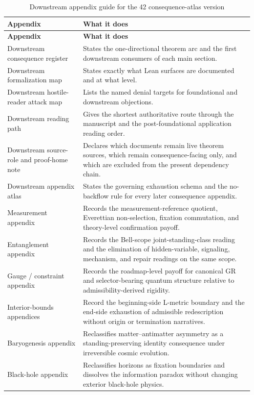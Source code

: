 \begin{longtable}{P{0.28\textwidth}P{0.62\textwidth}}
\caption{Downstream appendix guide for the 42 consequence-atlas version}\\
\toprule
\textbf{Appendix} & \textbf{What it does} \\
\midrule
\endfirsthead
\toprule
\textbf{Appendix} & \textbf{What it does} \\
\midrule
\endhead
\bottomrule
\endfoot
Downstream consequence register & States the one-directional theorem arc and the first downstream consumers of each main section. \\
Downstream formalization map & States exactly what Lean surfaces are documented and at what level. \\
Downstream hostile-reader attack map & Lists the named denial targets for foundational and downstream objections. \\
Downstream reading path & Gives the shortest authoritative route through the manuscript and the post-foundational application reading order. \\
Downstream source-role and proof-home note & Declares which documents remain live theorem sources, which remain consequence-facing only, and which are excluded from the present dependency chain. \\
Downstream appendix atlas & States the governing exhaustion schema and the no-backflow rule for every later consequence appendix. \\
Measurement appendix & Records the measurement-reference quotient, Everettian non-selection, fixation commutation, and theory-level confirmation payoff. \\
Entanglement appendix & Records the Bell-scope joint-standing-class reading and the elimination of hidden-variable, signaling, mechanism, and repair readings on the same scope. \\
Gauge / constraint appendix & Records the roadmap-level payoff for canonical GR and selector-bearing quantum structure relative to admissibility-derived rigidity. \\
Interior-bounds appendices & Record the beginning-side L-metric boundary and the end-side exhaustion of admissible redescription without origin or termination narratives. \\
Baryogenesis appendix & Reclassifies matter--antimatter asymmetry as a standing-preserving identity consequence under irreversible cosmic evolution. \\
Black-hole appendix & Reclassifies horizons as fixation boundaries and dissolves the information paradox without changing exterior black-hole physics. \\

\end{longtable}
